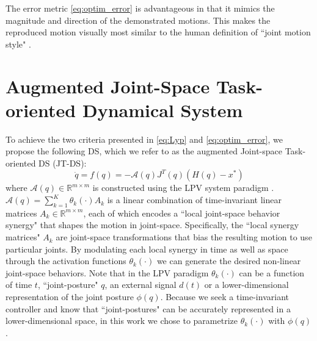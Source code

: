 \documentclass[letterpaper, 10 pt, journal, twoside, fleqn]{IEEEtran}
\begin{document}
\noindent The error metric \eqref{eq:optim_error} is advantageous in that it mimics the magnitude and direction of the demonstrated motions. This makes the reproduced motion visually most similar to the human definition of ``joint motion style" \cite{gielniak2010stylized}.

\section{Augmented \textbf{J}oint-Space \textbf{T}ask-oriented \textbf{D}ynamical \textbf{S}ystem} \label{Sec:DS}
\label{sec:proposed_system}
To achieve the two criteria presented in \eqref{eq:Lyp} and \eqref{eq:optim_error}, we propose the following DS, which we refer to as the augmented Joint-space Task-oriented DS (JT-DS): 
\begin{equation}
\label{eq:ds}
\dot{q} = f(q) = -\mathcal{A}(q)J^T(q)(H(q) - x^*)
\end{equation}
where  $\mathcal{A}(q)\in \mathbb{R}^{m\times m}$ is constructed using the LPV system paradigm \cite{emedi2016fixed,7439839}. $\mathcal{A}(q) = \sum\limits_{k=1}^{K}\theta_k(\cdot)A_k$ is a linear combination of time-invariant linear matrices $A_k \in \mathbb{R}^{m \times m}$, each of which encodes a ``local joint-space behavior synergy" that shapes the motion in joint-space.  Specifically, the ``local synergy matrices" $A_k$ are joint-space transformations that bias the resulting motion to use particular joints. By modulating each local synergy in time as well as space through the activation functions $\theta_k(\cdot)$ we can generate the desired non-linear joint-space behaviors. Note that in the LPV paradigm $\theta_k(\cdot)$ can be a function of time $t$, ``joint-posture" $q$, an external signal $d(t)$ or a lower-dimensional representation of the joint posture $\phi(q)$. Because we seek a time-invariant controller and know that ``joint-postures" can be accurately represented in a lower-dimensional space, in this work we chose to parametrize $\theta_k(\cdot)$ with $\phi(q)$.
\end{document}
